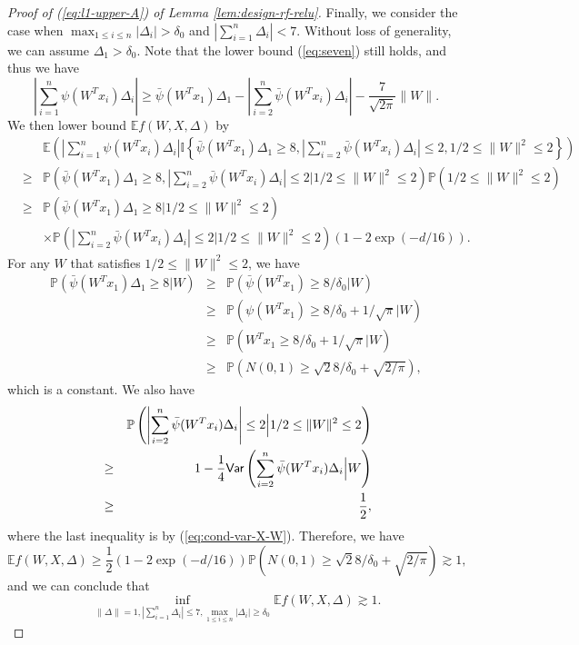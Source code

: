 \begin{proof}[Proof of (\ref{eq:l1-upper-A}) of Lemma \ref{lem:design-rf-relu}]
Finally, we consider the case when $\max_{1\leq i\leq n}|\Delta_i|> \delta_0$ and $\left|\sum_{i=1}^n\Delta_i\right|< 7$. Without loss of generality, we can assume $\Delta_1>\delta_0$. Note that the lower bound (\ref{eq:seven}) still holds, and thus we have
$$\left|\sum_{i=1}^n\psi(W^Tx_i)\Delta_i\right|\geq  \bar{\psi}(W^Tx_1)\Delta_1 - \left|\sum_{i=2}^n\bar{\psi}(W^Tx_i)\Delta_i\right| - \frac{7}{\sqrt{2\pi}}\|W\|.$$
We then lower bound $\mathbb{E}f(W,X,\Delta)$ by
\begin{eqnarray*}
&& \mathbb{E}\left(\left|\sum_{i=1}^n\psi(W^Tx_i)\Delta_i\right|\mathbb{I}\left\{ \bar{\psi}(W^Tx_1)\Delta_1 \geq 8, \left|\sum_{i=2}^n\bar{\psi}(W^Tx_i)\Delta_i\right|\leq 2, 1/2\leq \|W\|^2\leq 2\right\}\right) \\
&\geq& \mathbb{P}\left(\bar{\psi}(W^Tx_1)\Delta_1 \geq 8, \left|\sum_{i=2}^n\bar{\psi}(W^Tx_i)\Delta_i\right|\leq 2\Big|1/2\leq \|W\|^2\leq 2\right)\mathbb{P}\left(1/2\leq \|W\|^2\leq 2\right) \\
&\geq& \mathbb{P}\left(\bar{\psi}(W^Tx_1)\Delta_1 \geq 8\Big|1/2\leq \|W\|^2\leq 2\right) \\
&& \times \mathbb{P}\left(\left|\sum_{i=2}^n\bar{\psi}(W^Tx_i)\Delta_i\right|\leq 2\Big|1/2\leq \|W\|^2\leq 2\right)\left(1-2\exp(-d/16)\right).
\end{eqnarray*}
For any $W$ that satisfies $1/2\leq \|W\|^2\leq 2$, we have
\begin{eqnarray*}
\mathbb{P}\left(\bar{\psi}(W^Tx_1)\Delta_1 \geq 8\Big|W\right) &\geq& \mathbb{P}\left(\bar{\psi}(W^Tx_1)\geq 8/\delta_0\Big|W\right) \\
&\geq&  \mathbb{P}\left(\psi(W^Tx_1)\geq 8/\delta_0+1/\sqrt{\pi}\Big|W\right) \\
&\geq& \mathbb{P}\left(W^Tx_1\geq 8/\delta_0+1/\sqrt{\pi}\Big|W\right) \\
&\geq& \mathbb{P}\left(N(0,1)\geq \sqrt{2}8/\delta_0 + \sqrt{2/\pi}\right),
\end{eqnarray*}
which is a constant. We also have
\begin{eqnarray*}
&& \mathbb{P}\left(\left|\sum_{i=2}^n\bar{\psi}(W^Tx_i)\Delta_i\right|\leq 2\Big|1/2\leq \|W\|^2\leq 2\right) \\
&\geq& 1 - \frac{1}{4}\Var\left(\sum_{i=2}^n\bar{\psi}(W^Tx_i)\Delta_i\Big|W\right) \\
&\geq& \frac{1}{2},
\end{eqnarray*}
where the last inequality is by (\ref{eq:cond-var-X-W}). Therefore, we have
$$\mathbb{E}f(W,X,\Delta)\geq \frac{1}{2}\left(1-2\exp(-d/16)\right)\mathbb{P}\left(N(0,1)\geq \sqrt{2}8/\delta_0 + \sqrt{2/\pi}\right)\gtrsim 1,$$
and we can conclude that
\begin{equation}
\inf_{\|\Delta\|=1,|\sum_{i=1}^n\Delta_i|\leq 7, \max_{1\leq i\leq n}|\Delta_i|\geq\delta_0}\mathbb{E}f(W,X,\Delta) \gtrsim 1.\label{eq:l1-1-3-relu}
\end{equation}


\end{proof}
